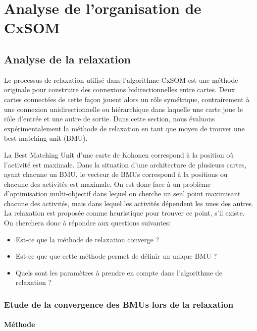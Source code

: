 \chapter{Analyse de l'organisation de CxSOM}\label{chap:analyse}
\graphicspath{{04-Analyse/}}
\minitoc
\section{Analyse de la relaxation}

Le processus de relaxation utilisé dans l'algorithme CxSOM est une méthode originale pour construire des connexions bidirectionnelles entre cartes. Deux cartes connectées de cette façon jouent alors un rôle symétrique, contrairement à une connexion unidirectionnelle ou hiérarchique dans laquelle une carte joue le rôle d'entrée et une autre de sortie. Dans cette section, nous évaluons expérimentalement la méthode de relaxation en tant que moyen de trouver une best matching unit (BMU). 

La Best Matching Unit d'une carte de Kohonen correspond à la position où l'activité est maximale. Dans la situation d'une architecture de plusieurs cartes, ayant chacune un BMU, le vecteur de BMUs correspond à la positions ou chacune des activités est maximale. On est donc face à un problème d'optimisation multi-objectif dans lequel on cherche un seul point maximisant chacune des activités, mais dans lequel les activités dépendent les unes des autres. La relaxation est proposée comme heuristique pour trouver ce point, s'il existe. On cherchera donc à répondre aux questions suivantes:
\begin{itemize}
\item Est-ce que la méthode de relaxation converge ?
\item Est-ce que que cette méthode permet de définir un unique BMU ?
\item Quels sont les paramètres à prendre en compte dans l'algorithme de relaxation ?
\end{itemize}

\subsection{Etude de la convergence des BMUs lors de la relaxation}\label{sec:conv}

\subsubsection{Méthode}


